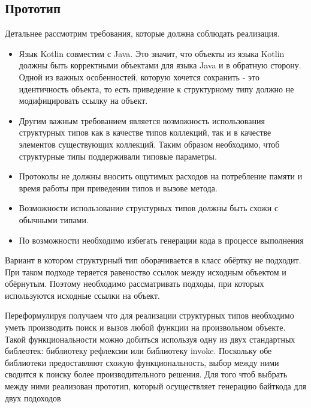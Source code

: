 \subsection{Прототип}

Детальнее рассмотрим требования, которые должна соблюдать реализация.

\begin{itemize}
\item Язык Kotlin совместим с Java. Это значит, что объекты из языка Kotlin должны быть корректными объектами для языка Java и в обратную сторону. Одной из важных особенностей, которую хочется сохранить - это идентичность объекта, то есть приведение к структурному типу должно не модифицировать ссылку на объект.
\item Другим важным требованием является возможность использования структурных типов как в качестве типов коллекций, так и в качестве элементов существующих коллекций. Таким образом необходимо, чтоб структурные типы поддерживали типовые параметры.
\item Протоколы не должны вносить ощутимых расходов на потребление памяти и время работы при приведении типов и вызове метода.
\item Возможности использование структурных типов должны быть схожи с обычными типами.
\item По возможности необходимо избегать генерации кода в процессе выполнения
\end{itemize}

Вариант в котором структурный тип оборачивается в класс обёртку не подходит. При таком подходе теряется равеноство ссылок между исходным объектом и обёрнутым. Поэтому необходимо рассматривать подходы, при которых используются исходные ссылки на объект.

Переформулируя получаем что для реализации структурных типов необходимо уметь производить поиск и вызов любой функции на произвольном объекте. Такой функциональности можно добиться используя одну из двух стандартных библеотек: библиотеку рефлексии или библиотеку invoke. Поскольку обе библиотеки предоставляют схожую функциональность, выбор между ними сводится к поиску более производительного решения. Для того чтоб выбрать между ними реализован прототип, который осуществляет генерацию байткода для двух подоходов